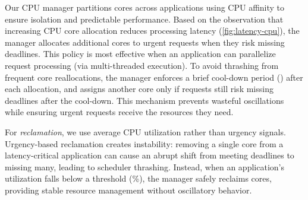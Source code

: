 

Our CPU manager partitions cores across applications using CPU affinity to ensure isolation and predictable performance.
Based on the observation that increasing CPU core allocation reduces processing latency (\autoref{fig:latency-cpu}), the manager allocates additional cores to urgent requests when they risk missing deadlines.
This policy is most effective when an application can parallelize request processing (\eg via multi-threaded execution).
To avoid thrashing from frequent core reallocations, the manager enforces a brief cool-down period (\eg {}) after each allocation, and assigns another core only if requests still risk missing deadlines after the cool-down.
This mechanism prevents wasteful oscillations while ensuring urgent requests receive the resources they need.

For \emph{reclamation}, we use average CPU utilization rather than urgency signals.
Urgency-based reclamation creates instability: removing a single core from a latency-critical application can cause an abrupt shift from meeting deadlines to missing many, leading to scheduler thrashing.
Instead, when an application's utilization falls below a threshold (\%), the manager safely reclaims cores, providing stable resource management without oscillatory behavior.

